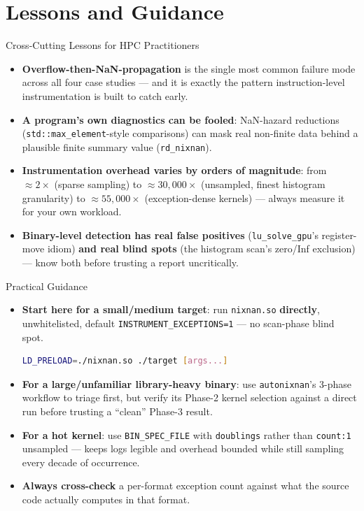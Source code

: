 \documentclass[aspectratio=169,11pt]{beamer}
\begin{document}
\section{Lessons and Guidance}

\begin{frame}{Cross-Cutting Lessons for HPC Practitioners}
\begin{itemize}
  \item \textbf{Overflow-then-NaN-propagation} is the single most common
    failure mode across all four case studies --- and it is exactly the
    pattern instruction-level instrumentation is built to catch early.
  \item \textbf{A program's own diagnostics can be fooled}: NaN-hazard
    reductions (\texttt{std::max\_element}-style comparisons) can mask real
    non-finite data behind a plausible finite summary value
    (\texttt{rd\_nixnan}).
  \item \textbf{Instrumentation overhead varies by orders of magnitude}: from
    $\approx\!2\times$ (sparse sampling) to $\approx\!30{,}000\times$
    (unsampled, finest histogram granularity) to $\approx\!55{,}000\times$
    (exception-dense kernels) --- always measure it for your own workload.
  \item \textbf{Binary-level detection has real false positives}
    (\texttt{lu\_solve\_gpu}'s register-move idiom) \textbf{and real blind
    spots} (the histogram scan's zero/Inf exclusion) --- know both before
    trusting a report uncritically.
\end{itemize}
\end{frame}

\begin{frame}[fragile]{Practical Guidance}
\begin{itemize}
  \item \textbf{Start here for a small/medium target}: run
    \texttt{nixnan.so} \textbf{directly}, unwhitelisted, default
    \texttt{INSTRUMENT\_EXCEPTIONS=1} --- no scan-phase blind spot.
\begin{lstlisting}[language=bash]
LD_PRELOAD=./nixnan.so ./target [args...]
\end{lstlisting}
  \item \textbf{For a large/unfamiliar library-heavy binary}: use
    \texttt{autonixnan}'s 3-phase workflow to triage first, but verify its
    Phase-2 kernel selection against a direct run before trusting a
    ``clean'' Phase-3 result.
  \item \textbf{For a hot kernel}: use \texttt{BIN\_SPEC\_FILE} with
    \texttt{doublings} rather than \texttt{count:1} unsampled --- keeps logs
    legible and overhead bounded while still sampling every decade of
    occurrence.
  \item \textbf{Always cross-check} a per-format exception count against
    what the source code actually computes in that format.
\end{itemize}
\end{frame}
\end{document}
